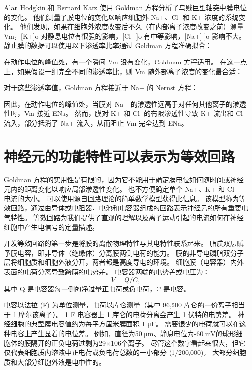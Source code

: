 Alan Hodgkin 和 Bernard Katz 使用 Goldman 方程分析了乌贼巨型轴突中膜电位的变化。 
他们测量了膜电位的变化以响应细胞外 Na+、Cl- 和 K+ 浓度的系统变化。 
他们发现，如果在细胞外浓度改变后不久（在内部离子浓度改变之前）测量 Vm，[K+]o 对静息电位有很强的影响，[Cl−]o 有中等影响，[Na+] ]o 影响不大。 
静止膜的数据可以使用以下渗透率比率通过 Goldman 方程准确拟合：


在动作电位的峰值处，有一个瞬间 Vm 没有变化，Goldman 方程适用。 
在这一点上，如果假设一组完全不同的渗透率比，则 Vm 随外部离子浓度的变化最合适：


对于这些渗透率值，Goldman 方程接近于 Na+ 的 Nernst 方程：


因此，在动作电位的峰值处，当膜对 Na+ 的渗透性远高于对任何其他离子的渗透性时，Vm 接近 ENa。 
然而，膜对 K+ 和 Cl- 的有限渗透性导致 K+ 流出和 Cl- 流入，部分抵消了 Na+ 流入，从而阻止 Vm 完全达到 ENa。



\section{神经元的功能特性可以表示为等效回路}

Goldman 方程的实用性是有限的，因为它不能用于确定膜电位如何随时间或神经元内的距离变化以响应局部渗透性变化。
也不方便确定单个 Na+、K+ 和 Cl− 电流的大小。
可以使用源自回路理论的简单数学模型获得此信息。
该模型称为等效回路，通过由导体或电阻器、电池和电容器组成的回路表示神经元的所有重要电气特性。
等效回路为我们提供了直观的理解以及离子运动引起的电流如何在神经细胞中产生电信号的定量描述。


开发等效回路的第一步是将膜的离散物理特性与其电特性联系起来。
脂质双层赋予膜电容，即非导体（绝缘体）分离膜两侧电荷的能力。
膜的非导电磷脂双分子层将细胞质和细胞外液分开，两者都是高度导电的环境。
细胞膜（电容器）内外表面的电荷分离导致跨膜的电势差。
电容器两端的电势差或电压为：
\begin{equation}
	V = Q/C,
\end{equation}
其中 Q 是电容器每一侧的净过量正电荷或负电荷，C 是电容。


电容以法拉 (F) 为单位测量，电荷以库仑测量（其中 96,500 库仑的一价离子相当于 1 摩尔该离子）。
1 F 电容器上 1 库仑的电荷分离会产生 1 伏特的电势差。
神经细胞的典型膜电容值约为每平方厘米膜面积 1 μF。 
需要很少的电荷就可以在这种电容上产生显着的电位差。 
例如，直径为50 μm、静息电位为-60 mV的球形细胞体的膜隔开的正负电荷过剩为29×106个离子。
尽管这个数字看起来很大，但它仅代表细胞质内溶液中正电荷或负电荷总数的一小部分 (1/200,000)。
大部分细胞质和大部分细胞外液是电中性的。


